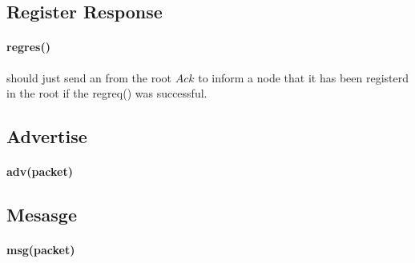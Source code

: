 \documentclass{article}
\begin{document}
\subsection{Register Response}
\paragraph{reg\underline{\hspace{.05in}}res()} should just send an from the root $Ack$ to inform a node that it has been registerd in the root if the reg\underline{\hspace{.05in}}req() was successful.
\subsection{Advertise}
\paragraph{adv(packet)}
\subsection{Mesasge}
\paragraph{msg(packet)}
\clearpage
\end{document}
